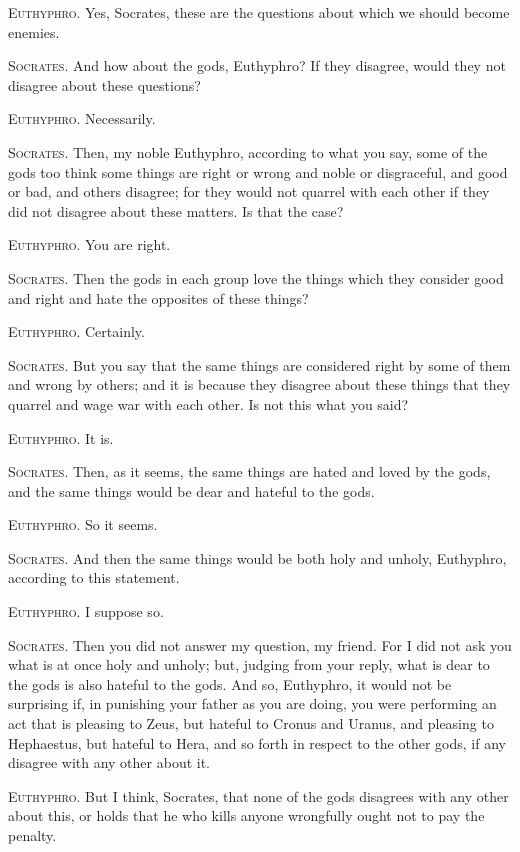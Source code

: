 \textsc{Euthyphro}. Yes, Socrates, these are the questions about which
we should become enemies.

\textsc{Socrates}. And how about the gods, Euthyphro? If they
disagree, would they not disagree about these questions?

\textsc{Euthyphro}. Necessarily.

\textsc{Socrates}. Then, my noble Euthyphro, according to what you
say, some of the gods too think some things are right or wrong and
noble or disgraceful, and good or bad, and others disagree; for they
would not quarrel with each other if they did not disagree about these
matters. Is that the case?

\textsc{Euthyphro}. You are right.

\textsc{Socrates}. Then the gods in each group love the things which
they consider good and right and hate the opposites of these things?

\textsc{Euthyphro}. Certainly.

\textsc{Socrates}. But you say that the same things are considered
right by some of them and wrong by others; and it is because they
disagree about these things that they quarrel and wage war with each
other. Is not this what you said?

\textsc{Euthyphro}. It is.

\textsc{Socrates}. Then, as it seems, the same things are hated and
loved by the gods, and the same things would be dear and hateful to
the gods.

\textsc{Euthyphro}. So it seems.

\textsc{Socrates}. And then the same things would be both
holy and unholy, Euthyphro, according to this statement.

\textsc{Euthyphro}. I suppose so.

\textsc{Socrates}. Then you did not answer my question, my friend. For
I did not ask you what is at once holy and unholy; but, judging from
your reply, what is dear to the gods is also hateful to the gods. And
so, Euthyphro, it would not be surprising if, in punishing your father
as you are doing, you were performing an act that is pleasing to Zeus,
but hateful to Cronus and Uranus, and pleasing to Hephaestus, but
hateful to Hera, and so forth in respect to the other gods, if any
disagree with any other about it.

\textsc{Euthyphro}. But I think, Socrates, that none of the gods
disagrees with any other about this, or holds that he who kills anyone
wrongfully ought not to pay the penalty.

